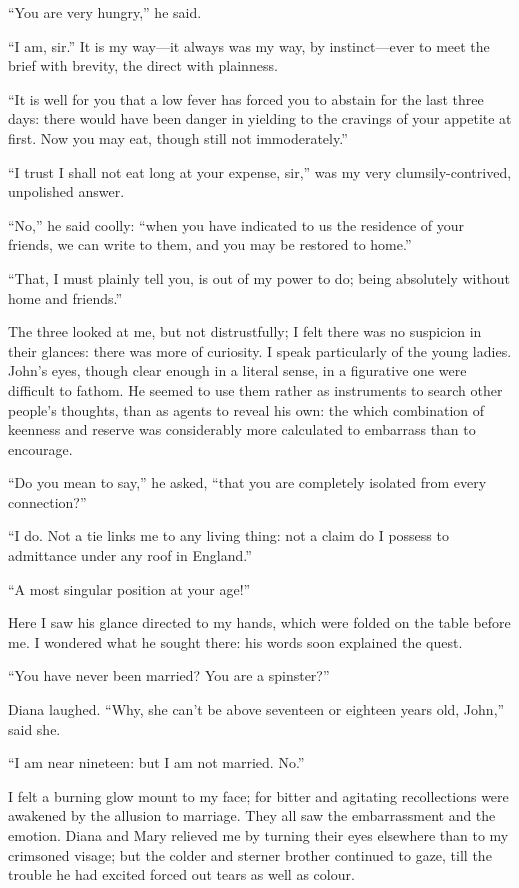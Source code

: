 \enquote{You are very hungry,} he said.

\enquote{I am, sir.} It is my way---it always was my way, by
instinct---ever to meet the brief with brevity, the direct with
plainness.

\enquote{It is well for you that a low fever has forced you to abstain
for the last three days: there would have been danger in yielding to the
cravings of your appetite at first. Now you may eat, though still not
immoderately.}

\enquote{I trust I shall not eat long at your expense, sir,} was my very
clumsily-contrived, unpolished answer.

\enquote{No,} he said coolly: \enquote{when you have indicated to us the
residence of your friends, we can write to them, and you may be restored
to home.}

\enquote{That, I must plainly tell you, is out of my power to do; being
absolutely without home and friends.}

The three looked at me, but not distrustfully; I felt there was no
suspicion in their glances: there was more of curiosity. I speak
particularly of the young ladies. \St{} John's eyes, though clear enough
in a literal sense, in a figurative one were difficult to fathom. He
seemed to use them rather as instruments to search other people's
thoughts, than as agents to reveal his own: the which combination of
keenness and reserve was considerably more calculated to embarrass than
to encourage.

\enquote{Do you mean to say,} he asked, \enquote{that you are completely
isolated from every connection?}

\enquote{I do. Not a tie links me to any living thing: not a claim do I
possess to admittance under any roof in England.}

\enquote{A most singular position at your age!}

Here I saw his glance directed to my hands, which were folded on the
table before me. I wondered what he sought there: his words soon
explained the quest.

\enquote{You have never been married? You are a spinster?}

Diana laughed. \enquote{Why, she can't be above seventeen or eighteen
years old, \St{} John,} said she.

\enquote{I am near nineteen: but I am not married. No.}

I felt a burning glow mount to my face; for bitter and agitating
recollections were awakened by the allusion to marriage. They all saw
the embarrassment and the emotion. Diana and Mary relieved me by
turning their eyes elsewhere than to my crimsoned visage; but the colder
and sterner brother continued to gaze, till the trouble he had excited
forced out tears as well as colour.


